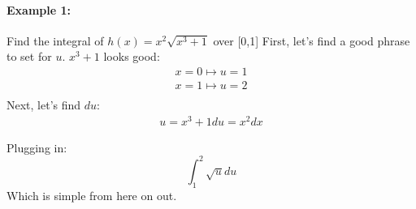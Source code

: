 \documentclass[../revisedmain.tex]{subfiles}
\begin{document}
	\paragraph{Example 1:} Find the integral of $h(x)=x^2\sqrt{x^3+1}$ over [0,1]
	First, let's find a good phrase to set for $u$. $x^3+1$ looks good:
	\begin{gather*}
		x=0\mapsto u=1\\
		x=1\mapsto u=2\\
	\end{gather*}
	Next, let's find $du$:
	\begin{gather*}
	u=x^3+1
	du=x^2dx
	\end{gather*}

	Plugging in:
	\[
	\int_{1}^{2}\sqrt{u}du
	\]
	Which is simple from here on out.\\
\end{document}
